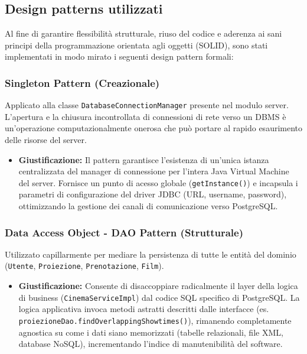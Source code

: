 \documentclass[12pt, a4paper]{article}
\begin{document}
\subsection{Design patterns utilizzati}
Al fine di garantire flessibilità strutturale, riuso del codice e aderenza ai sani principi della programmazione orientata agli oggetti (SOLID), sono stati implementati in modo mirato i seguenti design pattern formali:

\subsubsection{Singleton Pattern (Creazionale)}
Applicato alla classe \texttt{DatabaseConnectionManager} presente nel modulo server. L'apertura e la chiusura incontrollata di connessioni di rete verso un DBMS è un'operazione computazionalmente onerosa che può portare al rapido esaurimento delle risorse del server.
\begin{itemize}
    \item \textbf{Giustificazione:} Il pattern garantisce l'esistenza di un'unica istanza centralizzata del manager di connessione per l'intera Java Virtual Machine del server. Fornisce un punto di acesso globale (\texttt{getInstance()}) e incapsula i parametri di configurazione del driver JDBC (URL, username, password), ottimizzando la gestione dei canali di comunicazione verso PostgreSQL.
\end{itemize}

\subsubsection{Data Access Object - DAO Pattern (Strutturale)}
Utilizzato capillarmente per mediare la persistenza di tutte le entità del dominio (\texttt{Utente}, \texttt{Proiezione}, \texttt{Prenotazione}, \texttt{Film}). 
\begin{itemize}
    \item \textbf{Giustificazione:} Consente di disaccoppiare radicalmente il layer della logica di business (\texttt{CinemaServiceImpl}) dal codice SQL specifico di PostgreSQL. La logica applicativa invoca metodi astratti descritti dalle interfacce (es. \texttt{proiezioneDao.findOverlappingShowtimes()}), rimanendo completamente agnostica su come i dati siano memorizzati (tabelle relazionali, file XML, database NoSQL), incrementando l'indice di manutenibilità del software.
\end{itemize}
\end{document}
